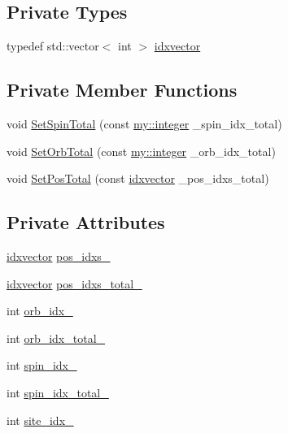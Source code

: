 \subsection*{Private Types}
\begin{DoxyCompactItemize}
\item 
typedef std\+::vector$<$ int $>$ \hyperlink{classLatticeIndex_a26424b62893a5cc8066c3a317fdb9d4d}{idxvector}
\end{DoxyCompactItemize}
\subsection*{Private Member Functions}
\begin{DoxyCompactItemize}
\item 
void \hyperlink{classLatticeIndex_a70024addd3bb681fa0c8be7cd6a051dc}{Set\+Spin\+Total} (const \hyperlink{namespacemy_a42365393c537edae1e89d20ff90d1923}{my\+::integer} \+\_\+spin\+\_\+idx\+\_\+total)
\item 
void \hyperlink{classLatticeIndex_aa5398d7f1b11a42a02ad8403d73151e3}{Set\+Orb\+Total} (const \hyperlink{namespacemy_a42365393c537edae1e89d20ff90d1923}{my\+::integer} \+\_\+orb\+\_\+idx\+\_\+total)
\item 
void \hyperlink{classLatticeIndex_a16cc74f07b9734fb4712c7aa6ac784d6}{Set\+Pos\+Total} (const \hyperlink{classLatticeIndex_a26424b62893a5cc8066c3a317fdb9d4d}{idxvector} \+\_\+pos\+\_\+idxs\+\_\+total)
\end{DoxyCompactItemize}
\subsection*{Private Attributes}
\begin{DoxyCompactItemize}
\item 
\hyperlink{classLatticeIndex_a26424b62893a5cc8066c3a317fdb9d4d}{idxvector} \hyperlink{classLatticeIndex_aeecd83c35e96218f001fce42b8382865}{pos\+\_\+idxs\+\_\+}
\item 
\hyperlink{classLatticeIndex_a26424b62893a5cc8066c3a317fdb9d4d}{idxvector} \hyperlink{classLatticeIndex_a67d044b0460af73e3a08048a875205e1}{pos\+\_\+idxs\+\_\+total\+\_\+}
\item 
int \hyperlink{classLatticeIndex_a60bde6082bfe6173b937f1b337fa01cb}{orb\+\_\+idx\+\_\+}
\item 
int \hyperlink{classLatticeIndex_a2eed237a134fa952457a9a45e2b29223}{orb\+\_\+idx\+\_\+total\+\_\+}
\item 
int \hyperlink{classLatticeIndex_a2f3c684375fb6e0e680565974ba8f859}{spin\+\_\+idx\+\_\+}
\item 
int \hyperlink{classLatticeIndex_a01b6edc3bd72a168b1faf3782a86f69c}{spin\+\_\+idx\+\_\+total\+\_\+}
\item 
int \hyperlink{classLatticeIndex_a7d2705266979c203e084bc90e390a560}{site\+\_\+idx\+\_\+}
\end{DoxyCompactItemize}


